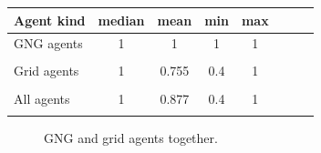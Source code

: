 \begin{center}
  \begin{tabular}{l*{6}{c}r}
  Agent kind        & median & mean & min & max \\
  \hline
  GNG agents        & 1 & 1 & 1 & 1  \\   
                    & \\
  Grid agents       & 1 & 0.755                 & 0.4 & 1  \\  
                    &   & \color{green}{+0.008} & \color{green}{+0.01}  \\
  All agents        & 1 & 0.877               & 0.4 & 1  \\
                    &   & \color{red}{-0.039} & \color{green}{0.01} \\
  \end{tabular}                                 
\end{center}



\begin{figure}[h!]
  \centering          
  \caption{GNG and grid agents together.}
\end{figure}